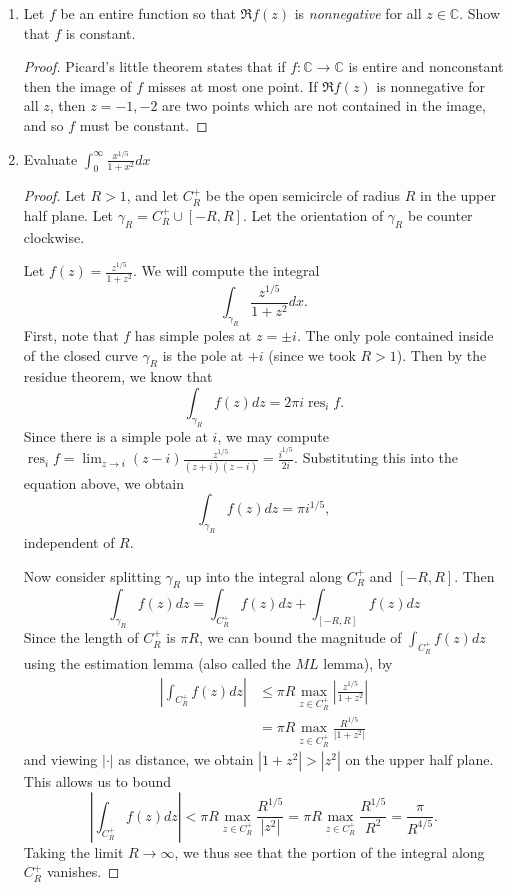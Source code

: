 \documentclass{article}
\DeclareMathOperator{\res}{res}
\begin{document}
\begin{enumerate}
	\item Let $f$ be an entire function so that $\Re f(z)$ is \textit{nonnegative} for all $z \in \mathbb{C}$. Show that $f$ is constant.
	
	\begin{proof}
		Picard's little theorem states that if $f: \mathbb{C}\rightarrow \mathbb{C}$ is entire and nonconstant
		then the image of $f$ misses at most one point. If $\Re f(z)$ is nonnegative for all $z$, then
		$z = -1, -2$ are two points which are not contained in the image, and so $f$ must be constant.
	\end{proof}
	
	\item Evaluate $\displaystyle \int_0^\infty \frac{x^{1/5}}{1+x^2} dx$
	
	\begin{proof}
		Let $R > 1$, and let $C_R^+$ be the open semicircle of radius $R$ in the upper half plane.
		Let $\gamma_R = C_R^+ \cup [-R,R]$. Let the orientation of $\gamma_R$ be counter clockwise.
		
		Let $f(z) = \frac{z^{1/5}}{1+z^2}$. We will compute the integral 
		\[ \int_{\gamma_R} \frac{z^{1/5}}{1+z^2} dx.\]
		First, note that $f$ has simple poles at $z = \pm i$.
		The only pole contained inside of the closed curve $\gamma_R$ is the pole at $+i$ (since we
		took $R>1$).
		Then by the residue theorem, we know that
		\[ \int_{\gamma_R} f(z) dz = 2\pi i \res_i f.\]
		Since there is a simple pole at $i$, we may compute 
		$\res_i f = \lim_{z \rightarrow i} (z-i) \frac{z^{1/5}}{(z+i)(z-i)}= \frac{i^{1/5}}{2i}.$
		Substituting this into the equation above, we obtain
		\[ \int_{\gamma_R} f(z) dz = \pi i^{1/5},\]
		independent of $R$.
		
		Now consider splitting $\gamma_R$ up into the integral along $C_R^+$ and $[-R,R]$.
		Then \[\int_{\gamma_R} f(z) dz = \int_{C_R^+} f(z) dz + \int_{[-R,R]} f(z) dz\]
		Since the length of $C_R^+$ is $\pi R$, 
		we can bound the magnitude of $\int_{C_R^+} f(z) dz$ using the estimation lemma
		(also called the $ML$ lemma), by
		\begin{align*}
		 \left | \int_{C_R^+} f(z) dz \right | &\leq \pi R \max_{z \in C_R^+} \left | \frac{z^{1/5}}{1+z^2} \right |\\
		 &= \pi R \max_{z \in C_R^+}  \frac{R^{1/5}}{|1+z^2|} 
		 \end{align*}
		 and viewing $|\cdot |$ as distance, we obtain $|1 + z^2| > |z^2|$ on the upper half plane.
		 This allows us to bound 
		 \[ \left | \int_{C_R^+} f(z) dz \right | < \pi R \max_{z \in C_R^+}  \frac{R^{1/5}}{|z^2|} = \pi R \max_{z \in C_R^+}  \frac{R^{1/5}}{R^2}=\frac{\pi}{R^{4/5}}. \]
		 Taking the limit $R \rightarrow \infty$, we thus see that the portion of the integral along $C_R^+$ vanishes.
		 

\end{proof}
\end{enumerate}
\end{document}
